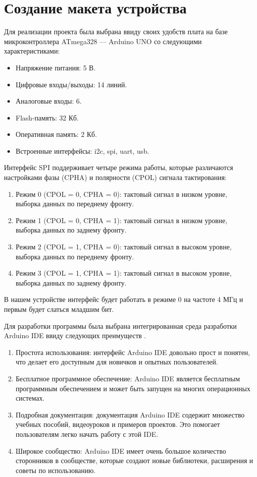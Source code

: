 \documentclass[14pt, oneside]{altsu-report}
\begin{document}
\chapter{Создание макета устройства} 
	Для реализации проекта была выбрана ввиду своих удобств плата на базе микроконтроллера ATmega328 --- Arduino UNO со следующими характеристиками\cite{uno}: 
	\begin{itemize}
		\item Напряжение питания: 5 В.
		\item Цифровые входы/выходы: 14 линий.
		\item Аналоговые входы: 6.
		\item Flash-память: 32 Кб.
		\item Оперативная память: 2 Кб.
		\item Встроенные интерфейсы: i2c, spi, uart, usb.
	\end{itemize}
	
		Интерфейс SPI поддерживает четыре режима работы, которые различаются настройками фазы (CPHA) и полярности (CPOL) сигнала тактирования\cite{spi}:
	\begin{enumerate}
		\item Режим 0 (CPOL = 0, CPHA = 0): тактовый сигнал в низком уровне, выборка данных по переднему фронту.
		\item Режим 1 (CPOL = 0, CPHA = 1): тактовый сигнал в низком уровне, выборка данных по заднему фронту.
		\item Режим 2 (CPOL = 1, CPHA = 0): тактовый сигнал в высоком уровне, выборка данных по переднему фронту.
		\item Режим 3 (CPOL = 1, CPHA = 1): тактовый сигнал в высоком уровне, выборка данных по заднему фронту.
	\end{enumerate}
		В нашем устройстве интерфейс будет работать в режиме 0 на частоте 4 МГц и первым будет слаться младшим бит. 
	
	Для разработки программы была выбрана интегрированная среда разработки Arduino IDE ввиду следующих преимуществ \cite{ide}.
	\begin{enumerate}
		\item Простота использования: интерфейс Arduino IDE довольно прост и понятен, что делает его доступным для новичков и опытных пользователей.
		\item Бесплатное программное обеспечение: Arduino IDE является бесплатным программным обеспечением и может быть запущен на многих операционных системах.
		\item Подробная документация: документация Arduino IDE содержит множество учебных пособий, видеоуроков и примеров проектов. Это помогает пользователям легко начать работу с этой IDE.
		\item Широкое сообщество: Arduino IDE имеет очень большое количество сторонников в сообществе, которые создают новые библиотеки, расширения и советы по использованию.
	\end{enumerate}
	
\end{document}
